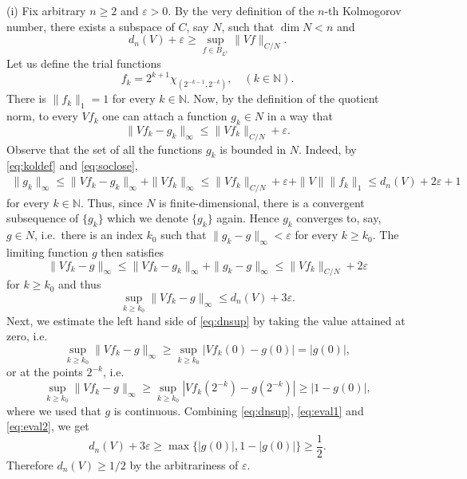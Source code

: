 \documentclass[10pt,reqno]{amsart}
\def\N{\mathbb{N}}
\def\dim{\operatorname{dim}}
\numberwithin{equation}{section}
\let\oldendproof\endproof
\renewenvironment{proof}[1][\proofname]{%
  \oldproof[\bf #1]%
}{\oldendproof}
\def\Li{{L^1}}
\def\Linf{{C}}
\begin{document}
\begin{proof}
(i) Fix arbitrary $n\ge 2$ and $\varepsilon >0$. By the very definition of
the $n$-th Kolmogorov number, there exists a subspace of $\Linf$, say $N$,
such that $\dim N < n$ and
\begin{equation} \label{eq:koldef}
	d_n(V)+\varepsilon
		\ge \sup_{f\in B_{\Li}} \|Vf\|_{\Linf/N}.
\end{equation}
Let us define the trial functions
\begin{equation} \label{eq:stairs}
	f_k = 2^{k+1} \chi_{(2^{-k-1},2^{-k})},
		\quad (k\in\N).
\end{equation}
There is $\|f_k\|_1 = 1$ for every $k\in\N$.
Now, by the definition of the quotient norm, to every $Vf_k$ one can attach a
function $g_k \in N$
in a way that
\begin{equation} \label{eq:soclose}
	\|Vf_k - g_k\|_\infty \le \|Vf_k\|_{\Linf/N} + \varepsilon.
\end{equation}
Observe that the set of all the functions $g_k$ is bounded in $N$. Indeed, by \eqref{eq:koldef} and \eqref{eq:soclose},
\begin{align*}
	\|g_k\|_\infty
		\le \|Vf_k - g_k\|_\infty + \|Vf_k\|_\infty
		\le \|Vf_k\|_{\Linf/N} + \varepsilon + \|V\|\|f_k\|_1
		\le d_n(V) + 2\varepsilon + 1
\end{align*}
for every $k\in\N$. Thus, since $N$ is finite-dimensional, there is a
convergent subsequence of $\{g_k\}$ which we denote $\{g_k\}$ again. Hence
$g_k$ converges to, say, $g\in N$, i.e.~there is an index $k_0$ such
that $\|g_k - g\|_\infty < \varepsilon$ for every $k\ge k_0$.
The limiting function $g$ then satisfies
\begin{equation*}
	\|Vf_k - g\|_\infty \le \|Vf_k - g_k\|_\infty + \|g_k - g\|_\infty
		\le \|Vf_k\|_{\Linf/N} + 2\varepsilon
\end{equation*}
for $k\ge k_0$ and thus
\begin{equation} \label{eq:dnsup}
	\sup_{k\ge k_0} \|Vf_k - g \|_\infty
		\le d_n(V) + 3\varepsilon.
\end{equation}
Next, we estimate the left hand side of \eqref{eq:dnsup} by taking the value attained at zero,
i.e.
\begin{equation} \label{eq:eval1}
	\sup_{k\ge k_0} \|Vf_k - g \|_\infty
	\ge \sup_{k\ge k_0} |Vf_k(0) - g(0) |
	= |g(0)|,
\end{equation}
or at the points $2^{-k}$, i.e.
\begin{equation} \label{eq:eval2}
	\sup_{k\ge k_0} \|Vf_k - g \|_\infty
	\ge \sup_{k\ge k_0} |Vf_k(2^{-k}) - g(2^{-k}) |
	\ge |1-g(0)|,
\end{equation}
where we used that $g$ is continuous.
Combining \eqref{eq:dnsup}, \eqref{eq:eval1} and \eqref{eq:eval2}, we get
\begin{equation*}
	d_n(V) + 3\varepsilon
	\ge \max \bigl\{ |g(0)|, 1-|g(0)| \bigr\}
	\ge \frac{1}{2}.
\end{equation*}
Therefore $d_n(V) \ge 1/2$ by the arbitrariness of $\varepsilon$.


\end{proof}
\end{document}
